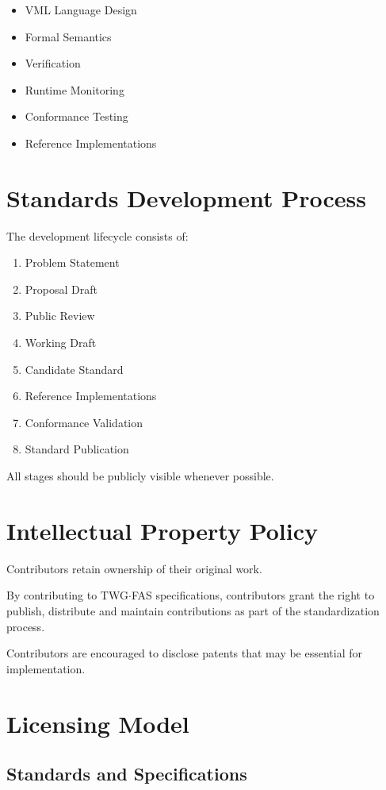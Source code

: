 \documentclass[11pt,a4paper]{article}
\begin{document}
\begin{itemize}
\item VML Language Design
\item Formal Semantics
\item Verification
\item Runtime Monitoring
\item Conformance Testing
\item Reference Implementations
\end{itemize}

\section{Standards Development Process}

The development lifecycle consists of:

\begin{enumerate}
\item Problem Statement
\item Proposal Draft
\item Public Review
\item Working Draft
\item Candidate Standard
\item Reference Implementations
\item Conformance Validation
\item Standard Publication
\end{enumerate}

All stages should be publicly visible whenever possible.

\section{Intellectual Property Policy}

Contributors retain ownership of their original work.

By contributing to TWG$\cdot$FAS specifications, contributors grant
the right to publish, distribute and maintain contributions as part
of the standardization process.

Contributors are encouraged to disclose patents that may be essential
for implementation.

\section{Licensing Model}

\subsection{Standards and Specifications}
\end{document}
